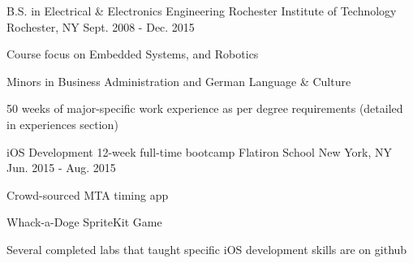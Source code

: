 
 \begin{cventries}
     \cventry
     {B.S. in Electrical \& Electronics Engineering} %
     {Rochester Institute of Technology} %
     {Rochester, NY} %
     {Sept. 2008 - Dec. 2015} %
     {\begin{cvitems} %
        \item {Course focus on Embedded Systems, and Robotics}
        \item {Minors in Business Administration and German Language \& Culture}
        \item {50 weeks of major-specific work experience as per degree          requirements (detailed in experiences section)}
        \end{cvitems}}
     \cventry
     {iOS Development 12-week full-time bootcamp}
     {Flatiron School}
     {New York, NY}
     {Jun. 2015 - Aug. 2015}
     {\begin{cvitems}
        \item{Crowd-sourced MTA timing app}
        \item{Whack-a-Doge SpriteKit Game}
        \item{Several completed labs that taught specific iOS development skills are on github}
        \end{cvitems}}
\end{cventries}
